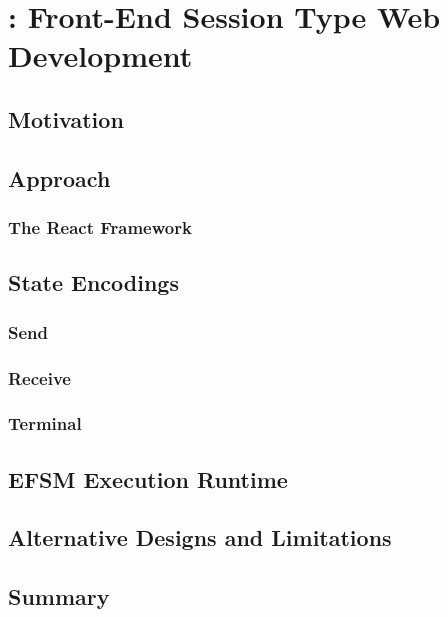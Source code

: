 \chapter{: Front-End Session Type Web Development}
\label{chap:react}

\section{Motivation}

\section{Approach}

\subsection{The React Framework}

\section{State Encodings}

\subsection{Send}

\subsection{Receive}

\subsection{Terminal}

\section{EFSM Execution Runtime}

\section{Alternative Designs and Limitations}

\section{Summary}
